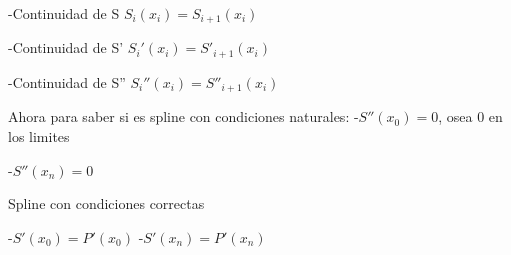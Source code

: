 \documentclass{article}
\begin{document}
-Continuidad de S $S_i(x_i) = S_{i+1}(x_i)$

-Continuidad de S' $S_i'(x_i) = S'_{i+1}(x_i)$

-Continuidad de S'' $S_i''(x_i) = S''_{i+1}(x_i)$

\vspace{5mm}

Ahora para saber si es spline con condiciones naturales:
-$S''(x_0) = 0$, osea $0$ en los limites

-$S''(x_n) = 0$

\vspace{5mm}

Spline con condiciones correctas

-$S'(x_0) = P'(x_0)$
-$S'(x_n) = P'(x_n)$
\vspace{5mm}
\end{document}
